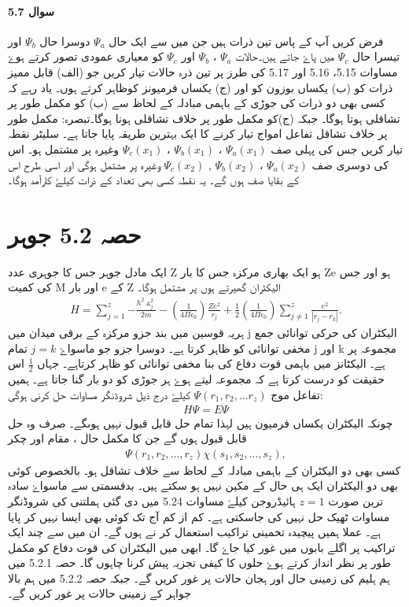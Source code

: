 \paragraph*{سوال 5.7}
فرض کریں آپ کے پاس تین ذرات ہیں جن میں سے ایک حال $ \Psi_{a} $ دوسرا حال $ \Psi_{b} $ اور تیسرا حال $ \Psi_{c} $ میں پاۓ جاتے ہیں۔حالات $ \Psi_{a} $ ، $ \Psi_{b} $ اور $ \Psi_{c} $ کو معیاری عمودی تصور کرتے ہوۓ مساوات 5.15، 5.16 اور 5.17 کی طرز پر تین ذرہ حالات تیار کریں جو (الف) قابل ممیز ذرات کو (ب) یکساں بوزون کو اور (ج) یکساں فرمیونز کوظاہر کرتے ہوں۔ یاد رہے کہ کسی بھی دو ذرات کی جوڑی کے باہمی مبادلہ کے لحاظ سے (ب) کو مکمل طور پر تشاقلی ہوتا ہوگا۔ جبکہ (ج)کو مکمل طور پر خلاف تشاقلی ہونا ہوگا۔تبصرہ: مکمل طور پر خلاف تشاقل تفاعل امواج تیار کرنے کا ایک بہترین طریقہ پایا جاتا ہے۔ سلیٹر نقطہ تیار کریں جس کی پہلی صف  $ \Psi_{a}(x_{1}) $ ، $ \Psi_{b}(x_{1}) $ ، $ \Psi_{c}(x_{1}) $ وغیرہ پر مشتمل ہو۔ اس کی دوسری صف $ \Psi_{a}(x_{2}) $ ، $ \Psi_{b}(x_{2}) $ , $ \Psi_{c}(x_{2}) $ وغیرہ پر مشتمل ہوگی اور اسی طرح اس کے بقایا صف ہوں گے۔ یہ نقطہ کسی بھی تعداد کے ذرات کیلۓ کارآمد ہوگا۔
\section*{حصہ 5.2 جوہر}
ایک مادل جوہر جس کا جوہری عدد Z ہو ایک بھاری مرکزہ جس کا بار Ze ہو اور جس کی کمیت M اور بار e کے Z الیکٹران گھیرتے ہوں پر مشتمل ہوگا۔
\begin{align}
H=\sum_{j=1}^{z} { -\frac{h^2 \vartriangle^2 _{j} }{2m}-(\frac{1}{4\Pi\epsilon_{0}})  \frac{Ze^2}{r_{j}} } + \frac{1}{2}(\frac{1}{4\Pi\epsilon_{0}}) \sum_{j\neq 1}^{z} \frac{e^2}{|r_{j} - r_{k} |}. 
\end{align}
ہریہ قوسین میں بند جزو مرکزہ کے برقی میدان میں j الیکٹران کی حرکی توانائی جمع مخفی توانائی کو ظاہر کرتا ہے۔ دوسرا جزو جو ماسواۓ $ j=k $ تمام j اور k مجموعہ پر ہے۔ الیکٹانز میں باہمی قوت دفاع کی بنا مخفی توانائی کو ظاہر کرتاہے۔ جہاں $ \frac{1}{2}
$ اس حقیقت کو درست کرتا ہے کہ مجموعہ لیتے ہوۓ ہر جوڑی کو دو بار گنا جاتا ہے۔ ہمیں تفاعل موج $ \Psi(r_{1} , r_{2}, ...r_{z}) $ کیلۓ درج ذیل شروڈنگر مساوات حل کرنی ہوگی:
\begin{align}
 H\Psi=E\Psi
\end{align}
چونکہ الیکٹران یکساں فرمیون ہیں لہذا تمام حل قابل قبول نہیں ہوںگے۔ صرف وہ حل قابل قبول ہوں گے جن کا مکمل حال ، مقام اور چکر 
\begin{align}
 \Psi(r_{1},r_{2},...,r_{z}) \chi(s_{1},s_{2},...,s_{z}), 
\end{align}
کسی بھی دو الیکٹران کے باہمی مبادلہ کے لحاظ سے خلاف تشاقل ہو۔ بالخصوص کوئی بھی دو الیکٹران ایک ہی حال کے مکین نہیں ہو سکتے ہیں۔ بدقسمتی سے ماسواۓ سادہ ترین صورت $ z=1 $  ہائیڈروجن کیلۓ مساوات 5.24 میں دی گئی ہملتنی کی شروڈنگر مساوات ٹھیک حل نہیں کی جاسکتی ہے۔ کم از کم آج تک کوئی بھی ایسا نہیں کر پایا ہے۔ عملا ہمیں پیچیدہ تخمینی تراکیب استعمال کر نے ہوں گے۔ ان میں سے چند ایک تراکیب پر اگلے بابوں میں غور کیا جاۓ گا۔ ابھی میں الیکٹران کی قوت دفاع کو مکمل طور پر نظر انداز کرتے ہوۓ حلوں کا کیفی تجزیہ پیش کرنا چاہوں گا۔ حصہ 5.2.1 میں ہم ہلیم کی زمینی حال اور ہجان  حالات پر غور کریں گے۔ جبکہ حصہ 5.2.2 میں ہم بالا جواہر کے زمینی حالات پر غور کریں گے۔
